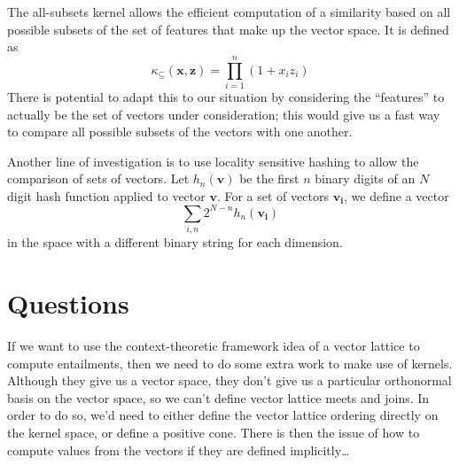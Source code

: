 \documentclass{article}
\begin{document}
The all-subsets kernel allows the efficient computation of a
similarity based on all possible subsets of the set of features that
make up the vector space. It is defined as
$$\kappa_\subseteq(\mathbf{x}, \mathbf{z}) = \prod_{i=1}^n (1+x_iz_i)$$
There is potential to adapt this to our situation by considering the
``features'' to actually be the set of vectors under consideration;
this would give us a fast way to compare all possible subsets of the
vectors with one another.

Another line of investigation is to use locality sensitive hashing to
allow the comparison of sets of vectors. Let $h_n(\mathbf{v})$ be the
first $n$ binary digits of an $N$ digit hash function applied to
vector $\mathbf{v}$. For a set of vectors $\mathbf{v_i}$, we define a
vector
$$\sum_{i,n} 2^{N-n} h_n(\mathbf{v_i})$$
in the space with a different binary string for each dimension.



\section{Questions}

If we want to use the context-theoretic framework idea of a vector
lattice to compute entailments, then we need to do some extra work to
make use of kernels. Although they give us a vector space, they don't
give us a particular orthonormal basis on the vector space, so we
can't define vector lattice meets and joins. In order to do so, we'd
need to either define the vector lattice ordering directly on the
kernel space, or define a positive cone. There is then the issue of
how to compute values from the vectors if they are defined
implicitly\ldots





\end{document}
